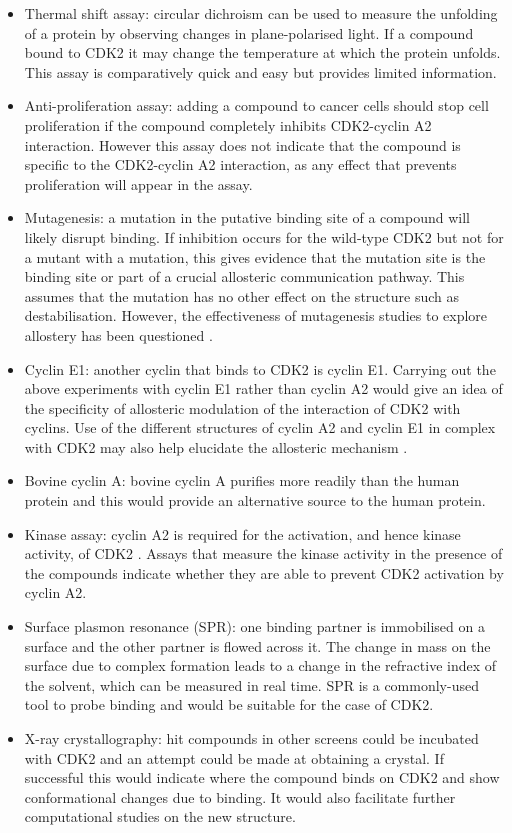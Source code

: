 \begin{itemize}
\item Thermal shift assay: circular dichroism can be used to measure the unfolding of a protein by observing changes in plane-polarised light.
If a compound bound to CDK2 it may change the temperature at which the protein unfolds.
This assay is comparatively quick and easy but provides limited information.
\item Anti-proliferation assay: adding a compound to cancer cells should stop cell proliferation if the compound completely inhibits CDK2-cyclin A2 interaction.
However this assay does not indicate that the compound is specific to the CDK2-cyclin A2 interaction, as any effect that prevents proliferation will appear in the assay.
\item Mutagenesis: a mutation in the putative binding site of a compound will likely disrupt binding.
If inhibition occurs for the wild-type CDK2 but not for a mutant with a mutation, this gives evidence that the mutation site is the binding site or part of a crucial allosteric communication pathway.
This assumes that the mutation has no other effect on the structure such as destabilisation.
However, the effectiveness of mutagenesis studies to explore allostery has been questioned \cite{Tang2017}.
\item Cyclin E1: another cyclin that binds to CDK2 is cyclin E1.
Carrying out the above experiments with cyclin E1 rather than cyclin A2 would give an idea of the specificity of allosteric modulation of the interaction of CDK2 with cyclins.
Use of the different structures of cyclin A2 and cyclin E1 in complex with CDK2 may also help elucidate the allosteric mechanism \cite{Honda2005}.
\item Bovine cyclin A: bovine cyclin A purifies more readily than the human protein \cite{Brown2015} and this would provide an alternative source to the human protein.
\item Kinase assay: cyclin A2 is required for the activation, and hence kinase activity, of CDK2 \cite{Jeffrey1995}.
Assays that measure the kinase activity in the presence of the compounds indicate whether they are able to prevent CDK2 activation by cyclin A2.
\item Surface plasmon resonance (SPR): one binding partner is immobilised on a surface and the other partner is flowed across it.
The change in mass on the surface due to complex formation leads to a change in the refractive index of the solvent, which can be measured in real time.
SPR is a commonly-used tool to probe binding and would be suitable for the case of CDK2.
\item X-ray crystallography: hit compounds in other screens could be incubated with CDK2 and an attempt could be made at obtaining a crystal.
If successful this would indicate where the compound binds on CDK2 and show conformational changes due to binding.
It would also facilitate further computational studies on the new structure.

\end{itemize}

